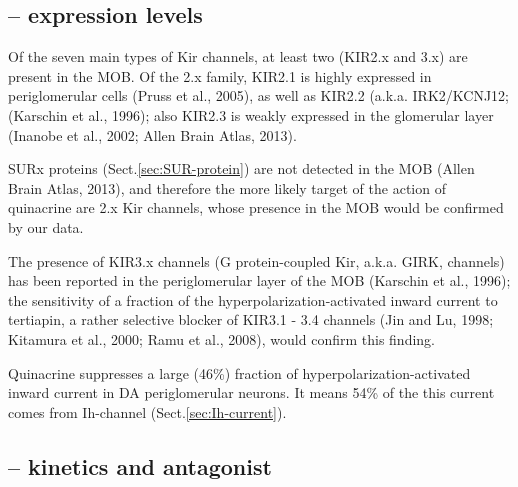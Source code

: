 %   







\subsection{-- expression levels}

Of the seven main types of Kir channels, at least two (KIR2.x and 3.x) are
present in the MOB. Of the 2.x family, KIR2.1 is highly expressed in
periglomerular cells (Pruss et al., 2005), as well as KIR2.2 (a.k.a.
IRK2/KCNJ12; (Karschin et al., 1996); also KIR2.3 is weakly expressed in the
glomerular layer (Inanobe et al., 2002; Allen Brain Atlas, 2013).

SURx proteins (Sect.\ref{sec:SUR-protein}) are not detected in the MOB (Allen
Brain Atlas, 2013), and therefore the more likely target of the action of
quinacrine are 2.x Kir channels, whose presence in the MOB would be confirmed by
our data.

The presence of KIR3.x channels (G protein-coupled Kir, a.k.a. GIRK, channels)
has been reported in the periglomerular layer of the MOB (Karschin et al.,
1996); the sensitivity of a fraction of the hyperpolarization-activated inward
current to tertiapin, a rather selective blocker of KIR3.1 - 3.4 channels (Jin and
Lu, 1998; Kitamura et al., 2000; Ramu et al., 2008), would confirm this finding.

Quinacrine suppresses a large (46\%) fraction of hyperpolarization-activated
inward current in DA periglomerular neurons. It means 54\% of the this current
comes from Ih-channel (Sect.\ref{sec:Ih-current}).

\subsection{-- kinetics and antagonist}
\label{sec:Kir-kinetics}


